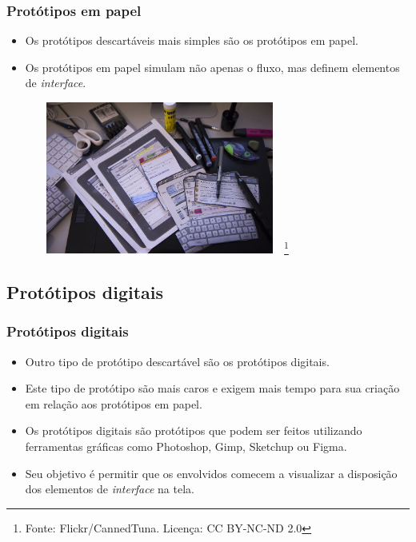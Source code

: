\documentclass[11pt]{beamer}
\begin{document}
    \begin{frame}
      \frametitle{Protótipos em papel}
      \begin{itemize}
        \item Os protótipos descartáveis mais simples são os protótipos em papel.
        \item Os protótipos em papel simulam não apenas o fluxo, mas definem elementos de \textit{interface}.
      \end{itemize}

      \begin{figure}[ht]
        \centering
        \includegraphics[height=5cm, width=8cm]{figures/paper_prototype.jpg}
        \footnote{Fonte: Flickr/CannedTuna. Licença: CC BY-NC-ND 2.0}
      \end{figure}
    \end{frame}

    \subsection{Protótipos digitais}

    \begin{frame}
      \frametitle{Protótipos digitais}
      \begin{itemize}
        \item Outro tipo de protótipo descartável são os protótipos digitais.
        \item Este tipo de protótipo são mais caros e exigem mais tempo para sua criação em relação aos protótipos em papel.
        \item Os protótipos digitais são protótipos que podem ser feitos utilizando ferramentas gráficas como Photoshop, Gimp, Sketchup ou Figma.
        \item Seu objetivo é permitir que os envolvidos comecem a visualizar a disposição dos elementos de \textit{interface} na tela.
      \end{itemize}
    \end{frame}
\end{document}
